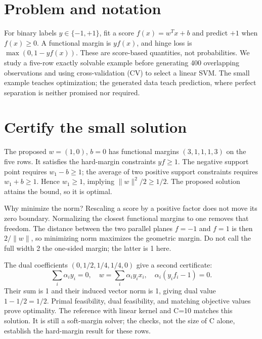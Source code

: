 

\section*{Problem and notation}
For binary labels $y\in\{-1,+1\}$, fit a score $f(x)=w^Tx+b$ and predict $+1$ when $f(x)\ge0$.
A functional margin is $yf(x)$, and hinge loss is $\max(0,1-yf(x))$. These are score-based quantities, not probabilities.
We study a five-row exactly solvable example before generating 400 overlapping observations and using cross-validation (CV) to select a linear SVM.
The small example teaches optimization; the generated data teach prediction, where perfect separation is neither promised nor required.

\section{Certify the small solution}
The proposed $w=(1,0)$, $b=0$ has functional margins $(3,1,1,1,3)$ on the five rows.
It satisfies the hard-margin constraints $yf\ge1$. The negative support point requires $w_1-b\ge1$;
the average of two positive support constraints requires $w_1+b\ge1$. Hence $w_1\ge1$, implying
$\|w\|^2/2\ge1/2$. The proposed solution attains the bound, so it is optimal.

Why minimize the norm? Rescaling a score by a positive factor does not move its zero boundary.
Normalizing the closest functional margins to one removes that freedom. The distance between the two
parallel planes $f=-1$ and $f=1$ is then $2/\|w\|$, so minimizing norm maximizes the geometric margin.
Do not call the full width 2 the one-sided margin; the latter is 1 here.

The dual coefficients $(0,1/2,1/4,1/4,0)$ give a second certificate:
\[
\sum_i\alpha_i y_i=0,\quad w=\sum_i\alpha_i y_ix_i,\quad
\alpha_i(y_if_i-1)=0.
\]
Their sum is 1 and their induced vector norm is 1, giving dual value $1-1/2=1/2$.
Primal feasibility, dual feasibility, and matching objective values prove optimality.
The reference  with linear kernel and C=10 matches this solution. It is still a soft-margin solver;
the checks, not the size of C alone, establish the hard-margin result for these rows.

